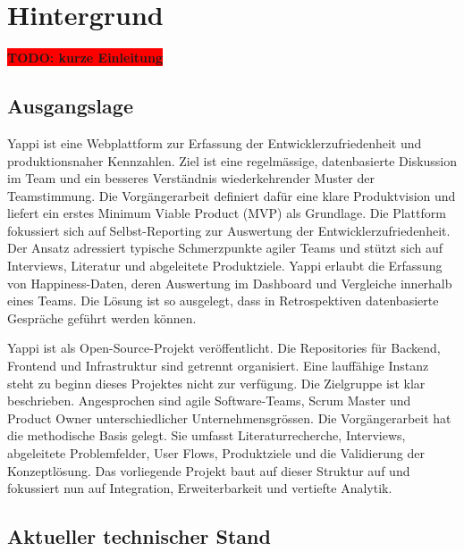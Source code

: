 \documentclass[12pt,a4paper]{report}
\newcommand{\todo}[1]{\colorbox{red}{\textbf{TODO: #1}}\\}
\begin{document}
\chapter{Hintergrund}

\todo{kurze Einleitung}

\section{Ausgangslage}

Yappi ist eine Webplattform zur Erfassung der Entwicklerzufriedenheit und produktionsnaher Kennzahlen. Ziel ist eine regelmässige,
datenbasierte Diskussion im Team und ein besseres Verständnis wiederkehrender Muster der Teamstimmung. Die Vorgängerarbeit
definiert dafür eine klare Produktvision und liefert ein erstes Minimum Viable Product (MVP) als Grundlage. Die Plattform 
fokussiert sich auf Selbst-Reporting zur Auswertung der Entwicklerzufriedenheit. Der Ansatz adressiert typische Schmerzpunkte
agiler Teams und stützt sich auf Interviews, Literatur und abgeleitete Produktziele. Yappi erlaubt die Erfassung von
Happiness-Daten, deren Auswertung im Dashboard und Vergleiche innerhalb eines Teams. Die Lösung ist so ausgelegt, dass in
Retrospektiven datenbasierte Gespräche geführt werden können.

Yappi ist als Open-Source-Projekt veröffentlicht. Die Repositories für Backend, Frontend und Infrastruktur sind getrennt 
organisiert. Eine lauffähige Instanz steht zu beginn dieses Projektes nicht zur verfügung. Die Zielgruppe ist klar beschrieben. 
Angesprochen sind agile Software-Teams, Scrum Master und Product Owner unterschiedlicher Unternehmensgrössen. Die Vorgängerarbeit
hat die methodische Basis gelegt. Sie umfasst Literaturrecherche, Interviews, abgeleitete Problemfelder, User Flows, Produktziele
und die Validierung der Konzeptlösung. Das vorliegende Projekt baut auf dieser Struktur auf und fokussiert nun auf Integration,
Erweiterbarkeit und vertiefte Analytik.

\section{Aktueller technischer Stand}
\end{document}
